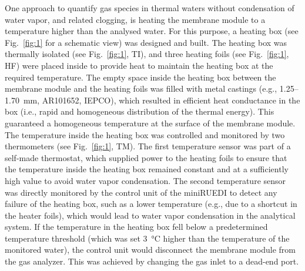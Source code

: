 One approach to quantify gas species in thermal waters without condensation of water vapor, and related clogging, is heating the membrane module to a temperature higher than the analysed water.
For this purpose, a heating box (see Fig.~\ref{fig:1} for a schematic view) was designed and built. 
The heating box was thermally isolated (see Fig.~\ref{fig:1}, TI), and three heating foils (see Fig.~\ref{fig:1}, HF) were placed inside to provide heat to maintain the heating box at the required temperature.
The empty space inside the heating box between the membrane module and the heating foils was filled with metal castings (e.g., 1.25--\SI{1.70}{\mm}, AR101652, IEPCO), which resulted in efficient heat conductance in the box (i.e., rapid and homogeneous distribution of the thermal energy). 
This guaranteed a homogeneous temperature at the surface of the membrane module.
The temperature inside the heating box was controlled and monitored by two thermometers (see Fig.~\ref{fig:1}, TM).
The first temperature sensor was part of a self-made thermostat, which supplied power to the heating foils to ensure that the temperature inside the heating box remained constant and at a sufficiently high value to avoid water vapor condensation.
The second temperature sensor was directly monitored by the control unit of the miniRUEDI to detect any failure of the heating box, such as a lower temperature (e.g., due to a shortcut in the heater foils), which would lead to water vapor condensation in the analytical system.
If the temperature in the heating box fell below a predetermined temperature threshold (which was set \SI{3}{\celsius} higher than the temperature of the monitored water), the control unit would disconnect the membrane module from the gas analyzer.
This was achieved by changing the gas inlet to a dead-end port.


